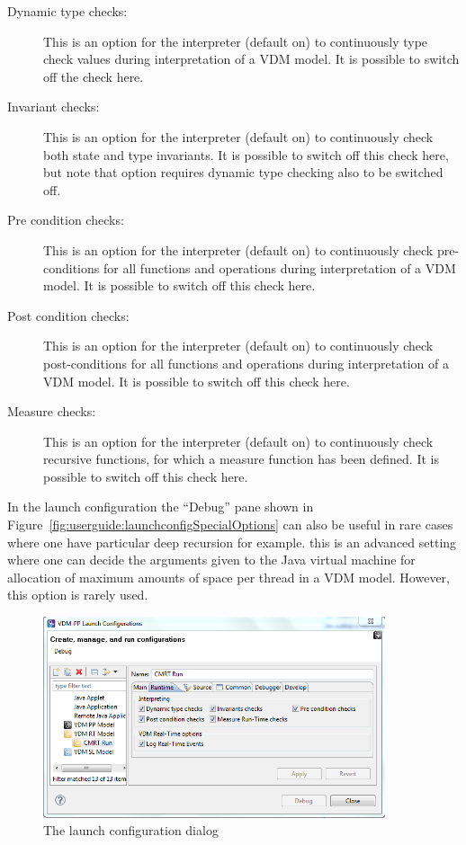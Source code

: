 \documentclass{overturerepchap}
\begin{document}
\begin{description}
\item[Dynamic type checks:] This is an option for the interpreter (default on) 
  to continuously type check  values during interpretation of a VDM model.
  It is possible to switch off the check here.
\item[Invariant checks:] This is an option for the interpreter (default on) 
  to continuously check both state and type invariants.
  It is possible to switch off
  this check here, but note that option requires dynamic type
  checking also to be switched off.
\item[Pre condition checks:] This is an option for the interpreter (default on) 
  to continuously check pre-conditions for all functions and operations
  during interpretation of a VDM model. It is possible to switch off
  this check here.
\item[Post condition checks:] This is an option for the interpreter (default on) 
  to continuously check post-conditions for all functions and operations
  during interpretation of a VDM model. It is possible to switch off
  this check here.
\item[Measure checks:] This is an option for the interpreter (default
  on) to continuously check recursive functions, for which a
  measure function has been defined. It is possible to switch off this
  check here.
\end{description}

In the launch
configuration the ``Debug'' pane shown in
Figure~\ref{fig:userguide:launchconfigSpecialOptions} can also be
useful in rare cases where one have particular deep recursion for
example. this is an advanced setting where one can decide the
arguments given to the Java virtual machine for allocation of maximum
amounts of space per thread in a VDM model. However, this option is
rarely used.

\begin{figure}[htp]
\begin{center}
  \includegraphics[width=380px]{screenDumps/launchconfigRToptions}
  \caption{The launch configuration dialog}
  \label{fig:userguide:launchconfigRToptions}
\end{center}
\end{figure}
\end{document}
